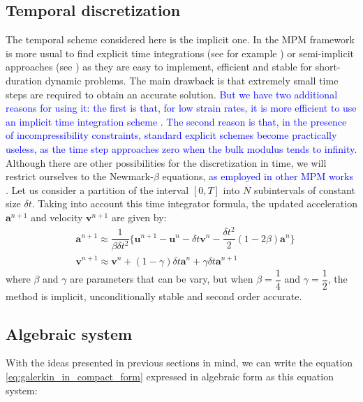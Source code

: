 \documentclass[11pt,english]{article}
\newcommand{\LM}[1]{\textcolor{blue}{#1}}
\begin{document}

	\subsection{Temporal discretization}
    The temporal scheme considered here is the implicit one. In the MPM framework is more usual to find explicit time integrations (see for example \cite{mast2012mitigating,li2014sloshing}) or  semi-implicit approaches (see \cite{zhang2017incompressible,li2022immersed}) as they are easy to implement, efficient and stable for short-duration dynamic problems. The main drawback is that extremely small time steps are required to obtain an accurate solution. \LM{But we have two additional reasons for using it: the first is that, for low strain rates, it is more efficient to use an implicit time integration scheme \cite{Vaucorbeil2020material25}. The second reason is that, in the presence of incompressibility constraints, standard explicit schemes become practically useless, as the time step approaches zero when the bulk modulus tends to infinity.}
    Although there are other possibilities for the discretization in time, we will restrict ourselves to the Newmark-$\beta$ equations, \LM{as employed in other MPM works \cite{xie2023implicit}}.
     Let us consider a partition of the interval $\left[0,T\right]$ into $N$ subintervals of constant size $\delta t$. Taking into account this time integrator formula, the updated acceleration $\boldsymbol{a}^{n+1}$ and velocity $\boldsymbol{v}^{n+1}$ are given by:
     \begin{align*}
         &\boldsymbol{a}^{n+1} \approx \dfrac{1}{\beta \delta t^2} \{\boldsymbol{u}^{n+1}-\boldsymbol{u}^n -\delta t\boldsymbol{v}^n-\dfrac{\delta t^2}{2}\left( 1-2\beta\right)\boldsymbol{a}^n \} \nonumber \\
         &\boldsymbol{v}^{n+1} \approx \boldsymbol{v}^{n} + (1-\gamma)\delta t \boldsymbol{a}^n + \gamma\delta t\boldsymbol{a}^{n+1}
     \end{align*}
     where $\beta$ and $\gamma$ are parameters that can be vary, but when $\beta=\dfrac{1}{4}$ and $\gamma=\dfrac{1}{2}$, the method is implicit, unconditionally stable and second order accurate.

     


     \subsection{Algebraic system} \label{sec:algebraic}
With the ideas presented in previous sections in mind, we can write the equation \eqref{eq:galerkin_in_compact_form} expressed in algebraic form as this equation system:
     
\end{document}
